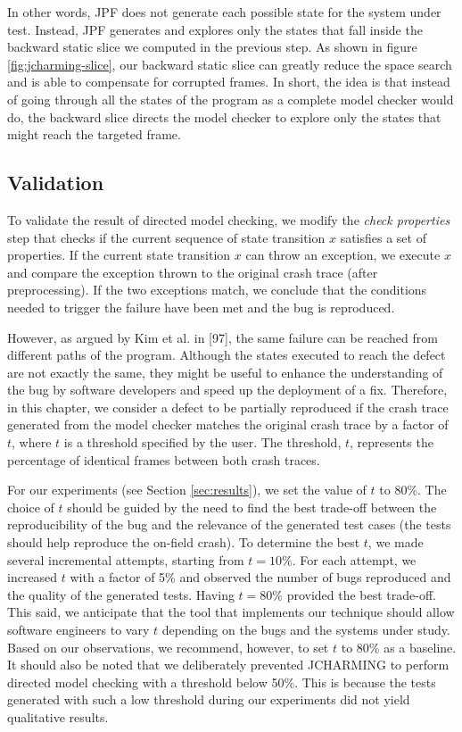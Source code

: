 \documentclass[12pt]{report}
\begin{document}
In other words, JPF does not generate each possible state for the system
under test. Instead, JPF generates and explores only the states that
fall inside the backward static slice we computed in the previous step.
As shown in figure \ref{fig:jcharming-slice}, our backward static slice
can greatly reduce the space search and is able to compensate for
corrupted frames. In short, the idea is that instead of going through
all the states of the program as a complete model checker would do, the
backward slice directs the model checker to explore only the states that
might reach the targeted frame.

\subsection{Validation}\label{validation}

To validate the result of directed model checking, we modify the
\emph{check properties} step that checks if the current sequence of
state transition \(x\) satisfies a set of properties. If the current
state transition \(x\) can throw an exception, we execute \(x\) and
compare the exception thrown to the original crash trace (after
preprocessing). If the two exceptions match, we conclude that the
conditions needed to trigger the failure have been met and the bug is
reproduced.

However, as argued by Kim et al. in {[}97{]}, the same failure can be
reached from different paths of the program. Although the states
executed to reach the defect are not exactly the same, they might be
useful to enhance the understanding of the bug by software developers
and speed up the deployment of a fix. Therefore, in this chapter, we
consider a defect to be partially reproduced if the crash trace
generated from the model checker matches the original crash trace by a
factor of \(t\), where \(t\) is a threshold specified by the user. The
threshold, \(t\), represents the percentage of identical frames between
both crash traces.

For our experiments (see Section \ref{sec:results}), we set the value of
\(t\) to 80\%. The choice of \(t\) should be guided by the need to find
the best trade-off between the reproducibility of the bug and the
relevance of the generated test cases (the tests should help reproduce
the on-field crash). To determine the best \(t\), we made several
incremental attempts, starting from \(t = 10\%\). For each attempt, we
increased \(t\) with a factor of 5\% and observed the number of bugs
reproduced and the quality of the generated tests. Having \(t = 80\%\)
provided the best trade-off. This said, we anticipate that the tool that
implements our technique should allow software engineers to vary \(t\)
depending on the bugs and the systems under study. Based on our
observations, we recommend, however, to set \(t\) to 80\% as a baseline.
It should also be noted that we deliberately prevented JCHARMING to
perform directed model checking with a threshold below 50\%. This is
because the tests generated with such a low threshold during our
experiments did not yield qualitative results.
\end{document}
